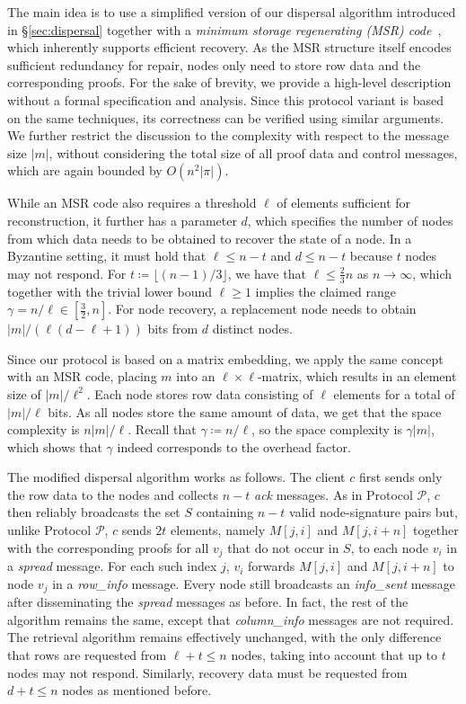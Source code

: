 \documentclass[sigconf,screen]{acmart}
\begin{document}
The main idea is to use a simplified version of our dispersal algorithm introduced in \S\ref{sec:dispersal} together with a 
\emph{minimum storage regenerating (MSR) code}~\cite{dimakis2010}, which inherently supports efficient recovery. As the MSR structure itself encodes sufficient redundancy for repair, nodes only need to store row data and the corresponding proofs. For the sake of brevity, we provide a high-level description without a formal specification and analysis.
Since this protocol variant is based on the same techniques, its correctness can be verified using similar arguments. We further restrict the discussion to the complexity with respect to the message size $|m|$, without considering the total size of all proof data and control messages, which are again bounded by $O(n^2|\pi|)$.

While an MSR code also requires a threshold $\ell$ of elements sufficient for reconstruction, it further has a parameter $d$, which specifies the number of nodes from which data needs to be obtained to recover the state of a node.
In a Byzantine setting, it must hold that $\ell \le n-t$ and $d \le n-t$ because $t$ nodes may not respond.
For $t \coloneqq \lfloor(n-1)/3\rfloor$, we have that $\ell \le \frac{2}{3}n$ as $n \rightarrow \infty$, which together with the trivial lower bound $\ell \ge 1$ implies the claimed range $\gamma = n/\ell \in [\frac{3}{2}, n]$.
For node recovery, a replacement node needs to obtain ${|m|}/(\ell(d-\ell+1))$ bits from $d$ distinct nodes.

Since our protocol is based on a matrix embedding, we apply the same concept with an MSR code, placing $m$ into an $\ell \times \ell$-matrix, which results in an element size of $|m|/\ell^2$. Each node stores row data consisting of $\ell$ elements for a total of $|m|/\ell$ bits. As all nodes store the same amount of data, we get that the space complexity is $n|m|/\ell$. Recall that $\gamma \coloneqq n/\ell$, so the space complexity is $\gamma|m|$, which shows that $\gamma$ indeed corresponds to the overhead factor.

The modified dispersal algorithm works as follows. The client $c$ first sends only the row data to the nodes and collects $n-t$ \emph{ack} messages. As in Protocol $\mathcal{P}$, $c$ then reliably broadcasts the set $S$ containing $n-t$ valid node-signature pairs but, unlike Protocol $\mathcal{P}$, $c$ sends $2t$ elements, namely $M[j,i]$ and $M[j,i+n]$ together with the corresponding proofs for all $v_j$ that do not occur in $S$, to each node $v_i$ in a \emph{spread} message. For each such index $j$, $v_i$ forwards $M[j,i]$ and $M[j,i+n]$ to node $v_j$ in a \emph{row\_info} message. Every node still broadcasts an \emph{info\_sent} message after disseminating the \emph{spread} messages as before. In fact, the rest of the algorithm remains the same, except that \emph{column\_info} messages are not required.
The retrieval algorithm remains effectively unchanged, with the only difference that rows are requested from $\ell + t \le n$ nodes, taking into account that up to $t$ nodes may not respond. Similarly, recovery data must be requested from $d+t \le n$ nodes as mentioned before.
\end{document}
